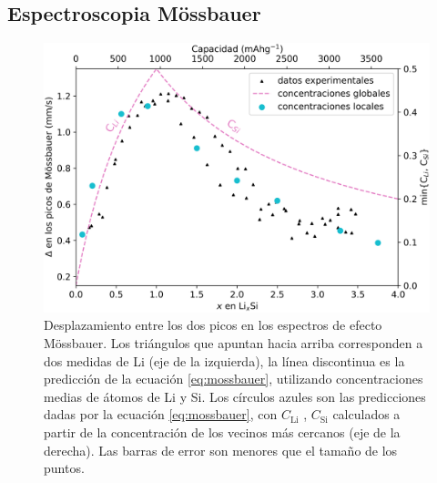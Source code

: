 \subsection{Espectroscopia Mössbauer}

\begin{figure}[h!]
    \centering
    \includegraphics[width=.7\textwidth]{Silicio/prediccion/resultados/mossbauer/mossbauer.png}
    \caption{Desplazamiento entre los dos picos en los espectros de efecto 
    Mössbauer. Los triángulos que apuntan hacia arriba corresponden a dos 
    medidas de Li  (eje de la izquierda), la línea discontinua es la 
    predicción de la ecuación \ref{eq:mossbauer}, utilizando concentraciones 
    medias de átomos de Li y Si. Los círculos azules son las predicciones dadas 
    por la ecuación \ref{eq:mossbauer}, con $C_{\text{Li}}$ , $C_{\text{Si}}$ 
    calculados a partir de la concentración de los vecinos más cercanos (eje de 
    la derecha). Las barras de error son menores que el tamaño de los puntos.}
    \label{fig:mossbauer}
\end{figure}
